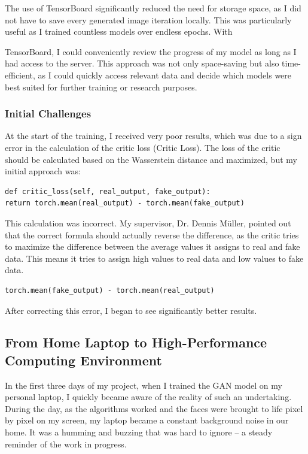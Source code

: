 \documentclass[a4paper, 12pt]{article}
\begin{document}
The use of TensorBoard significantly reduced the need for storage space, as I did not have to save every generated image iteration locally. This was particularly useful as I trained countless models over endless epochs. With

 TensorBoard, I could conveniently review the progress of my model as long as I had access to the server. This approach was not only space-saving but also time-efficient, as I could quickly access relevant data and decide which models were best suited for further training or research purposes.

\subsubsection{Initial Challenges}
At the start of the training, I received very poor results, which was due to a sign error in the calculation of the critic loss (Critic Loss). The loss of the critic should be calculated based on the Wasserstein distance and maximized, but my initial approach was:

\begin{verbatim}
def critic_loss(self, real_output, fake_output):
return torch.mean(real_output) - torch.mean(fake_output)
\end{verbatim}

This calculation was incorrect. My supervisor, Dr. Dennis Müller, pointed out that the correct formula should actually reverse the difference, as the critic tries to maximize the difference between the average values it assigns to real and fake data. This means it tries to assign high values to real data and low values to fake data.

\begin{verbatim}
torch.mean(fake_output) - torch.mean(real_output)
\end{verbatim}

After correcting this error, I began to see significantly better results.

\subsection{From Home Laptop to High-Performance Computing Environment}
In the first three days of my project, when I trained the GAN model on my personal laptop, I quickly became aware of the reality of such an undertaking. During the day, as the algorithms worked and the faces were brought to life pixel by pixel on my screen, my laptop became a constant background noise in our home. It was a humming and buzzing that was hard to ignore – a steady reminder of the work in progress.
\end{document}
